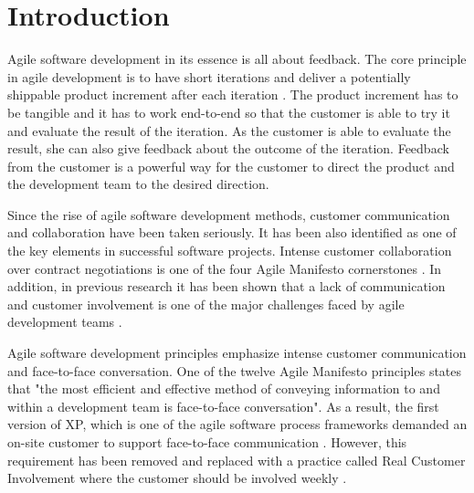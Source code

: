 \documentclass[english,12pt,a4paper,pdftex]{article}
\begin{document}
\storeinipagenumber
{}
\setcounter{page}{1}

\clearpage

\acresetall

\section{Introduction}

Agile software development in its essence is all about feedback. The core principle in agile development is to have short iterations and deliver a potentially shippable product increment after each iteration \citep{schwaber2009agile}. The product increment has to be tangible and it has to work end-to-end so that the customer is able to try it and evaluate the result of the iteration. As the customer is able to evaluate the result, she can also give feedback about the outcome of the iteration. Feedback from the customer is a powerful way for the customer to direct the product and the development team to the desired direction.

Since the rise of agile software development methods, customer communication and collaboration have been taken seriously. It has been also identified as one of the key elements in successful software projects. Intense customer collaboration over contract negotiations is one of the four Agile Manifesto cornerstones \citep{agilemanifesto}. In addition, in previous research it has been shown that a lack of communication and customer involvement is one of the major challenges faced by agile development teams \citep{korkala2006}.

Agile software development principles emphasize intense customer communication and face-to-face conversation. One of the twelve Agile Manifesto principles states that "the most efficient and effective method of conveying information to and within a development team is face-to-face conversation". \citep{agilemanifesto} As a result, the first version of \ac{XP}, which is one of the agile software process frameworks demanded an on-site customer to support face-to-face communication \citep{beck2004}. However, this requirement has been removed and replaced with a practice called Real Customer Involvement where the customer should be involved weekly \citep{korkala2006}.
\end{document}
